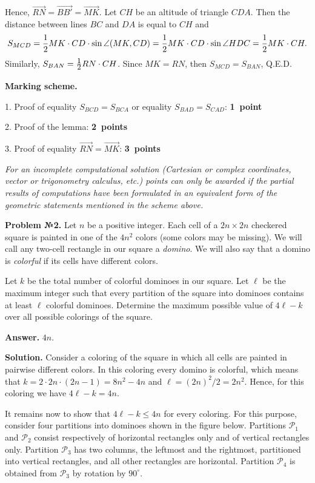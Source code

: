 \documentclass[12pt]{article}
\def\avtor#1{\linebreak[2] \hspace*{\fill}{\small (\mbox{\textit{#1})}}}
\def \Problem#1{\par \bigskip \textbf{Problem №{#1}. }}
\def \solution{\par \bigskip \textbf{Solution. }}
\def \answer{\par \bigskip \textbf{Answer. }}
\def \marking{\par \bigskip \textbf{Marking scheme. }}
\def\leq{\leqslant}
\def\frac#1#2{\mathchoice{#1\over#2}{\hbox{\small$#1$}\over\mathstrut\hbox{\small$#2$}}{#1\over#2}{#1\over#2}}
\begin{document}
Hence,  $\overrightarrow{RN} =\overrightarrow{BB'}=\overrightarrow{MK}$. Let $CH$ be an altitude of triangle $CDA$. Then the distance between lines $BC$ and $DA$ is equal to $CH$ and
$$
S_{MCD}
=
\frac{1}{2} MK \cdot CD \cdot \sin \angle(MK,CD) 
=
\frac{1}{2} MK \cdot CD \cdot \sin \angle HDC 
=
\frac{1}{2} MK \cdot CH
.
$$
Similarly, $S_{BAN}=\frac{1}{2}RN \cdot CH$. Since $MK=RN$, then $S_{MCD}=S_{BAN}$, Q.E.D.

\marking

1. Proof of equality $S_{BCD}=S_{BCA}$ or equality $S_{BAD}=S_{CAD}$: \dotfill\textbf{1~point}

\smallskip

2. Proof of the lemma: \dotfill\textbf{2~points}

\smallskip

3. Proof of equality $\overrightarrow{RN} = \overrightarrow{MK}$: \dotfill\textbf{3~points}

\smallskip

\textit{For an incomplete computational solution (Cartesian or complex coordinates, vector or trigonometry calculus, etc.) points can only be awarded if the partial results of computations have been formulated in an equivalent form of the geometric statements mentioned in the scheme above.}


\Problem{2} Let $n$ be a positive integer. Each cell of a $2n\times 2n$ checkered square is painted in one of the $4n^2$ colors (some colors may be missing). We will call any two-cell rectangle in our square a \textit{domino}. We will also say that a domino is \textit{colorful} if its cells have different colors.

Let $k$ be the total number of colorful dominoes in our square. Let $\ell$ be the maximum integer such that every partition of the square into dominoes contains at least $\ell$ colorful dominoes. Determine the maximum possible value of $4\ell - k$ over all possible colorings of the square.  \avtor{Bogdanov~I.}

\answer $4n$.

\solution Consider a coloring of the square in which all cells are painted in pairwise different colors. In this coloring every domino is colorful, which means that $k = 2 \cdot 2n \cdot (2n - 1) = 8 n^2 - 4 n$ and $\ell = (2n)^2 / 2 = 2 n^2$. Hence, for this coloring we have $4 \ell - k = 4 n$.

It remains now to show that $4\ell-k\leq 4n$ for every coloring. For this purpose, consider four partitions into dominoes shown in the figure below. Partitions $\mathcal P_1$ and $\mathcal P_2$ consist respectively of horizontal rectangles only and of vertical rectangles only. Partition $\mathcal P_3$ has two columns, the leftmost and the rightmost, partitioned into vertical rectangles, and all other rectangles are horizontal. Partition $\mathcal P_4$ is obtained from $\mathcal P_3$ by rotation by $90^\circ$. 
\end{document}
